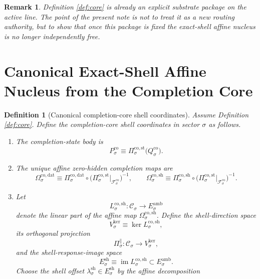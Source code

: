 \documentclass[11pt]{article}
\newcommand{\AmbientTarget}[1]{E_{#1}^{\mathrm{amb}}}
\newcommand{\CoreState}[1]{\mathcal C_{#1}}
\newcommand{\CoreAffine}[1]{\mathcal F_{#1}^{\mathrm{co}}}
\newcommand{\CoreBody}[1]{Q_{#1}^{\mathrm{co}}}
\newcommand{\CoreStateBody}[1]{P_{#1}^{\mathrm{co}}}
\newcommand{\CoreStateProj}[1]{\Pi_{#1}^{\mathrm{co,st}}}
\newcommand{\CoreDataProj}[1]{\Pi_{#1}^{\mathrm{co,dat}}}
\newcommand{\CoreShellProj}[1]{\Pi_{#1}^{\mathrm{co,sh}}}
\newcommand{\CoreDataMap}[1]{\Omega_{#1}^{\mathrm{co,dat}}}
\newcommand{\CoreShellMap}[1]{\Omega_{#1}^{\mathrm{co,sh}}}
\newcommand{\ShellNormal}[1]{E_{#1}^{\mathrm{sh}}}
\newcommand{\CoreShellLin}[1]{L_{#1}^{\mathrm{co,sh}}}
\newcommand{\ShellOffset}[1]{\lambda_{#1}^{\mathrm{sh}}}
\newcommand{\ShellKer}[1]{V_{#1}^{\mathrm{ker}}}
\newcommand{\DirProj}[1]{\Pi_{#1}^{\parallel}}
\newtheorem{definition}{Definition}
\newtheorem{remark}{Remark}
\begin{document}
\begin{remark}
Definition \ref{def:core} is already an explicit substrate package on the active line. The point of the present note is not to treat it as a new routing authority, but to show that once this package is fixed the exact-shell affine nucleus is no longer independently free.
\end{remark}

\section{Canonical Exact-Shell Affine Nucleus from the Completion Core}

\begin{definition}[Canonical completion-core shell coordinates]
\label{def:canonical}
Assume Definition \ref{def:core}. Define the completion-core shell coordinates in sector \(\sigma\) as follows.
\begin{enumerate}
    \item The completion-state body is
    \begin{equation}
    \CoreStateBody{\sigma}
    \equiv
    \CoreStateProj{\sigma}\bigl(\CoreBody{\sigma}\bigr).
    \label{eq:corestatebody}
    \end{equation}
    \item The unique affine zero-hidden completion maps are
    \begin{equation}
    \CoreDataMap{\sigma}
    \equiv
    \CoreDataProj{\sigma}\circ
    \bigl(
    \CoreStateProj{\sigma}\big|_{\CoreAffine{\sigma}}
    \bigr)^{-1},
    \qquad
    \CoreShellMap{\sigma}
    \equiv
    \CoreShellProj{\sigma}\circ
    \bigl(
    \CoreStateProj{\sigma}\big|_{\CoreAffine{\sigma}}
    \bigr)^{-1}.
    \label{eq:coremaps}
    \end{equation}
    \item Let
    \[
    \CoreShellLin{\sigma}:\CoreState{\sigma}\to\AmbientTarget{\sigma}
    \]
    denote the linear part of the affine map \(\CoreShellMap{\sigma}\). Define the shell-direction space
    \[
    \ShellKer{\sigma}\equiv\ker \CoreShellLin{\sigma},
    \]
    its orthogonal projection
    \[
    \DirProj{\sigma}:\CoreState{\sigma}\to\ShellKer{\sigma},
    \]
    and the shell-response-image space
    \[
    \ShellNormal{\sigma}\equiv\operatorname{im}\CoreShellLin{\sigma}\subset\AmbientTarget{\sigma}.
    \]
    Choose the shell offset \(\ShellOffset{\sigma}\in\ShellNormal{\sigma}\) by the affine decomposition
    \begin{equation}

\end{equation}
\end{enumerate}
\end{definition}
\end{document}
